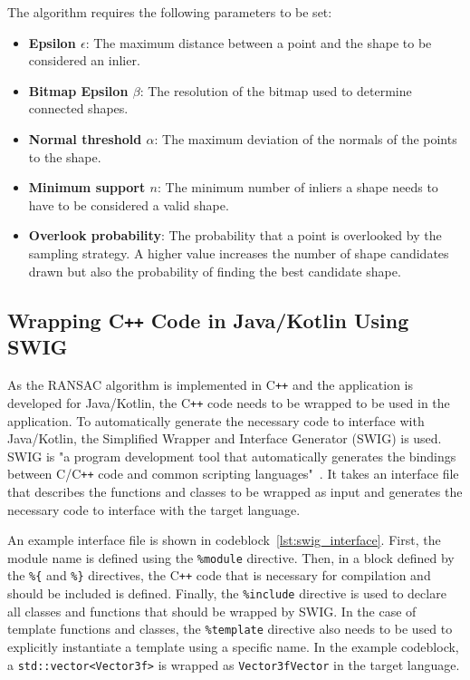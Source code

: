 The algorithm requires the following parameters to be set:
\begin{itemize}
    \item \textbf{Epsilon $\epsilon$}: The maximum distance between a point and the shape to be considered an inlier.
    \item \textbf{Bitmap Epsilon $\beta$}: The resolution of the bitmap used to determine connected shapes.
    \item \textbf{Normal threshold $\alpha$}: The maximum deviation of the normals of the points to the shape.
    \item \textbf{Minimum support $n$}: The minimum number of inliers a shape needs to have to be considered a valid shape.
    \item \textbf{Overlook probability}: The probability that a point is overlooked by the sampling strategy. A higher value increases the number of shape candidates drawn but also the probability of finding the best candidate shape.
\end{itemize}

\subsection{Wrapping C\texttt{++} Code in Java/Kotlin Using SWIG}
As the RANSAC algorithm is implemented in C\texttt{++} and the application is developed for Java/Kotlin,
the C\texttt{++} code needs to be wrapped to be used in the application.
To automatically generate the necessary code to interface with Java/Kotlin,
the Simplified Wrapper and Interface Generator (SWIG) is used.
SWIG is "a program development tool that automatically generates the bindings between C/C\texttt{++}
code and common scripting languages"~\parencite{beazley_swig_1996}.
It takes an interface file that describes the functions and classes to be wrapped as input and generates the
necessary code to interface with the target language.

An example interface file is shown in codeblock~\ref{lst:swig_interface}.
First, the module name is defined using the \texttt{\%module} directive.
Then, in a block defined by the \texttt{\%\{} and \texttt{\%\}} directives,
the C\texttt{++} code that is necessary for compilation and should be included is defined.
Finally, the \texttt{\%include} directive is used to declare all classes and functions that should be wrapped by SWIG\@.
In the case of template functions and classes, the \texttt{\%template} directive also needs to be used
to explicitly instantiate a template using a specific name.
In the example codeblock, a \texttt{std::vector<Vector3f>} is wrapped as \texttt{Vector3fVector} in the target language.

